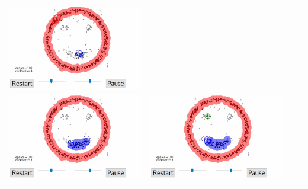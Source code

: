 \documentclass{beamer}
\begin{document}
\begin{frame}
{\begin{tabular}{cccc}
		\includegraphics[scale=0.15]{dbscan/3}\\
		\includegraphics[scale=0.15]{dbscan/31}&
		\includegraphics[scale=0.15]{dbscan/4}&

\end{tabular}}
\end{frame}
\end{document}
